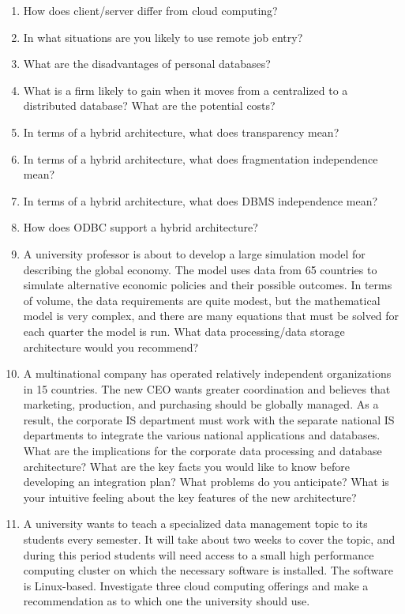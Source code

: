 \documentclass[
]{article}
\begin{document}
\begin{enumerate}
\def\labelenumi{\arabic{enumi}.}
\item
  How does client/server differ from cloud computing?
\item
  In what situations are you likely to use remote job entry?
\item
  What are the disadvantages of personal databases?
\item
  What is a firm likely to gain when it moves from a centralized to a
  distributed database? What are the potential costs?
\item
  In terms of a hybrid architecture, what does transparency mean?
\item
  In terms of a hybrid architecture, what does fragmentation
  independence mean?
\item
  In terms of a hybrid architecture, what does DBMS independence mean?
\item
  How does ODBC support a hybrid architecture?
\item
  A university professor is about to develop a large simulation model
  for describing the global economy. The model uses data from 65
  countries to simulate alternative economic policies and their
  possible outcomes. In terms of volume, the data requirements are
  quite modest, but the mathematical model is very complex, and there
  are many equations that must be solved for each quarter the model is
  run. What data processing/data storage architecture would you
  recommend?
\item
  A multinational company has operated relatively independent
  organizations in 15 countries. The new CEO wants greater
  coordination and believes that marketing, production, and purchasing
  should be globally managed. As a result, the corporate IS department
  must work with the separate national IS departments to integrate the
  various national applications and databases. What are the
  implications for the corporate data processing and database
  architecture? What are the key facts you would like to know before
  developing an integration plan? What problems do you anticipate?
  What is your intuitive feeling about the key features of the new
  architecture?
\item
  A university wants to teach a specialized data management topic to
  its students every semester. It will take about two weeks to cover
  the topic, and during this period students will need access to a
  small high performance computing cluster on which the necessary
  software is installed. The software is Linux-based. Investigate
  three cloud computing offerings and make a recommendation as to
  which one the university should use.
\end{enumerate}
\end{document}
